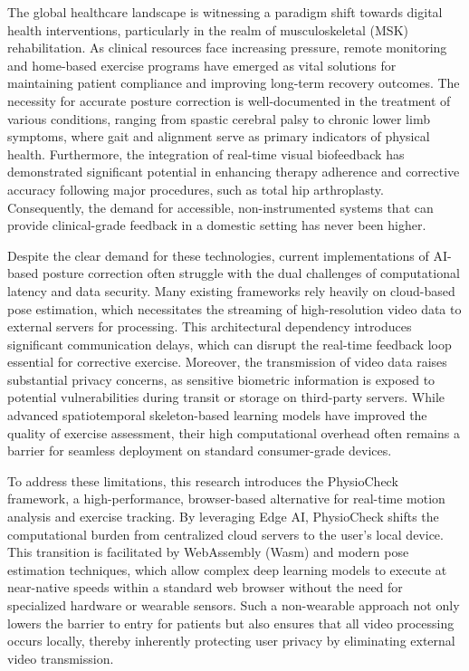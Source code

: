 \documentclass[conference]{IEEEtran}
\begin{document}
The global healthcare landscape is witnessing a paradigm shift towards digital health interventions, particularly in the realm of musculoskeletal (MSK) rehabilitation. As clinical resources face increasing pressure, remote monitoring and home-based exercise programs have emerged as vital solutions for maintaining patient compliance and improving long-term recovery outcomes. The necessity for accurate posture correction is well-documented in the treatment of various conditions, ranging from spastic cerebral palsy to chronic lower limb symptoms, where gait and alignment serve as primary indicators of physical health. Furthermore, the integration of real-time visual biofeedback has demonstrated significant potential in enhancing therapy adherence and corrective accuracy following major procedures, such as total hip arthroplasty. Consequently, the demand for accessible, non-instrumented systems that can provide clinical-grade feedback in a domestic setting has never been higher.

Despite the clear demand for these technologies, current implementations of AI-based posture correction often struggle with the dual challenges of computational latency and data security. Many existing frameworks rely heavily on cloud-based pose estimation, which necessitates the streaming of high-resolution video data to external servers for processing. This architectural dependency introduces significant communication delays, which can disrupt the real-time feedback loop essential for corrective exercise. Moreover, the transmission of video data raises substantial privacy concerns, as sensitive biometric information is exposed to potential vulnerabilities during transit or storage on third-party servers. While advanced spatiotemporal skeleton-based learning models have improved the quality of exercise assessment, their high computational overhead often remains a barrier for seamless deployment on standard consumer-grade devices.

To address these limitations, this research introduces the PhysioCheck framework, a high-performance, browser-based alternative for real-time motion analysis and exercise tracking. By leveraging Edge AI, PhysioCheck shifts the computational burden from centralized cloud servers to the user’s local device. This transition is facilitated by WebAssembly (Wasm) and modern pose estimation techniques, which allow complex deep learning models to execute at near-native speeds within a standard web browser without the need for specialized hardware or wearable sensors. Such a non-wearable approach not only lowers the barrier to entry for patients but also ensures that all video processing occurs locally, thereby inherently protecting user privacy by eliminating external video transmission.
\end{document}

